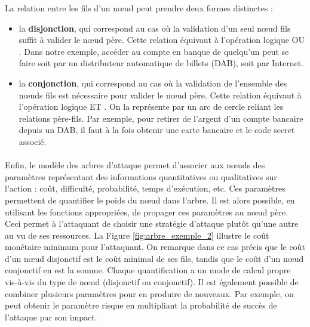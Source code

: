         La relation entre les fils d'un nœud peut prendre deux formes distinctes :
        \begin{itemize}

            \item la {\bf disjonction}, qui correspond au cas où la validation d'un seul nœud fils suffit à valider le nœud père. Cette relation équivaut à l'opération logique \og OU \fg{}. Dans notre exemple, accéder au compte en banque de quelqu'un peut se faire soit par un distributeur automatique de billets (DAB), soit par Internet.

            
            \item la {\bf conjonction}, qui correspond au cas où la validation de l'ensemble des nœuds fils est nécessaire pour valider le nœud père. Cette relation équivaut à l'opération logique \og ET \fg{}. On la représente par un arc de cercle reliant les relations père-fils. Par exemple, pour retirer de l'argent d'un compte bancaire depuis un DAB, il faut à la fois obtenir une carte bancaire et le code secret associé.
        \end{itemize} 
	

	\paragraph{}
        Enfin, le modèle des arbres d'attaque permet d'associer aux nœuds des paramètres représentant des informations quantitatives ou qualitatives sur l'action : coût, difficulté, probabilité, temps d'exécution, etc. Ces paramètres permettent de quantifier le poids du nœud dans l'arbre. Il est alors possible, en utilisant les fonctions appropriées, de propager ces paramètres au nœud père. Ceci permet à l'attaquant de choisir une stratégie d'attaque plutôt qu'une autre au vu de ses ressources. La Figure \ref{fig:arbre_exemple_2} illustre le coût monétaire minimum pour l'attaquant. On remarque dans ce cas précis que le coût d'un nœud disjonctif est le coût minimal de ses fils, tandis que le coût d'un nœud conjonctif en est la somme. Chaque quantification a un mode de calcul propre vis-à-vis du type de nœud (disjonctif ou conjonctif). Il est également possible de combiner plusieurs paramètres pour en produire de nouveaux. Par exemple, on peut obtenir le paramètre \og risque \fg{}  en multipliant la \og probabilité de succès\fg{} de l'attaque par son \og impact\fg{}.

